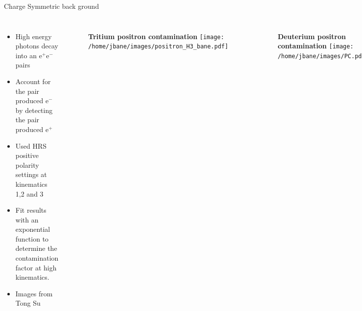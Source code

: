 \documentclass{beamer}
\begin{document}
\begin{frame}{Charge Symmetric back ground}
\begin{block}{}
	\begin{columns}
		\begin{itemize}
			\item High energy photons decay into an e$^+$e$^-$ pairs
			\item Account for the pair produced e$^-$ by detecting the pair produced e$^+$
			\item Used HRS positive polarity settings at kinematics 1,2 and 3
			\item Fit results with an exponential function to determine the contamination factor at high kinematics.
			\item Images from Tong Su
		\end{itemize}
		\vspace{-12pt}
		\begin{figure}
			\textbf{Tritium positron contamination}
			\texttt{[image: /home/jbane/images/positron\_H3\_bane.pdf]}
		\end{figure}
			\vspace{-20pt}
		\begin{figure}
			\textbf{Deuterium positron contamination}
			\texttt{[image: /home/jbane/images/PC.pdf]}
		\end{figure}
	\end{columns}
	
\end{block}
\end{frame}
\end{document}
